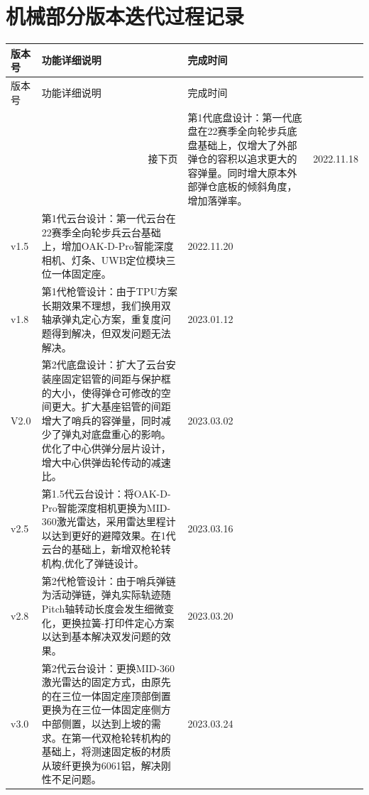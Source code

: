 \section{机械部分版本迭代过程记录}
\begin{longtable}[htbp!]{ m{2cm}<{\centering}  m{9.5cm}<{\centering}m{3cm}<{\centering} }
\hline

版本号  &   功能详细说明    &   完成时间    \\
\hline
\endfirsthead
\hline

版本号  &   功能详细说明    &   完成时间    \\
\hline
\endhead
\hline
\multicolumn{2}{r}{接下页}
\endfoot
\caption{机械部分版本迭代过程记录}
\label{tab:机械部分版本迭代过程记录}
\endlastfoot

\hline
 V1.0 & 第1代底盘设计：第一代底盘在22赛季全向轮步兵底盘基础上，仅增大了外部弹仓的容积以追求更大的容弹量。同时增大原本外部弹仓底板的倾斜角度，增加落弹率。   & 2022.11.18 \\

 \hline
 v1.5 & 第1代云台设计：第一代云台在22赛季全向轮步兵云台基础上，增加OAK-D-Pro智能深度相机、灯条、UWB定位模块三位一体固定座。 &2022.11.20 \\

 \hline
 v1.8 & 第1代枪管设计：由于TPU方案长期效果不理想，我们换用双轴承弹丸定心方案，重复度问题得到解决，但双发问题无法解决。 & 2023.01.12  \\

\hline
 V2.0 & 第2代底盘设计：扩大了云台安装座固定铝管的间距与保护框的大小，使得弹仓可修改的空间更大。扩大基座铝管的间距增大了哨兵的容弹量，同时减少了弹丸对底盘重心的影响。优化了中心供弹分层片设计，增大中心供弹齿轮传动的减速比。 & 2023.03.02  \\
 
\hline
v2.5 & 第1.5代云台设计：将OAK-D-Pro智能深度相机更换为MID-360激光雷达，采用雷达里程计以达到更好的避障效果。在1代云台的基础上，新增双枪轮转机构,优化了弹链设计。 & 2023.03.16 \\

\hline
v2.8 & 第2代枪管设计：由于哨兵弹链为活动弹链，弹丸实际轨迹随Pitch轴转动长度会发生细微变化，更换拉簧-打印件定心方案以达到基本解决双发问题的效果。 & 2023.03.20 \\

\hline
v3.0 & 第2代云台设计：更换MID-360激光雷达的固定方式，由原先的在三位一体固定座顶部倒置更换为在三位一体固定座侧方中部侧置，以达到上坡的需求。在第一代双枪轮转机构的基础上，将测速固定板的材质从玻纤更换为6061铝，解决刚性不足问题。& 2023.03.24 \\

\hline

\end{longtable}

